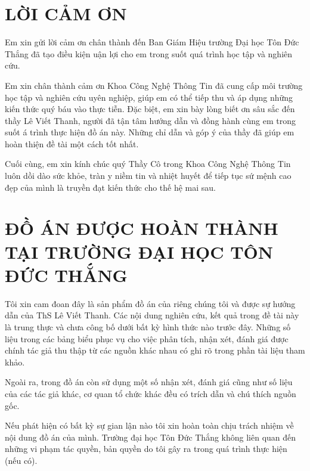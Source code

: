 \documentclass[13pt]{article}
\begin{document}
\chead{}
\cfoot{}
\rfoot{\thepage}

\newpage
\section*{LỜI CẢM ƠN}
    Em xin gửi lời cảm ơn chân thành đến Ban Giám Hiệu trường Đại học Tôn Đức Thắng đã tạo điều kiện uận lợi cho em trong suốt quá trình học tập và nghiên cứu.
    
    Em xin chân thành cảm ơn Khoa Công Nghệ Thông Tin đã cung cấp môi trường học tập và nghiên cứu uyên nghiệp, giúp em có thể tiếp thu và áp dụng những kiến thức quý báu vào thực tiễn. Đặc biệt, em xin bày lòng biết ơn sâu sắc đến thầy Lê Viết Thanh, người đã tận tâm hướng dẫn và đồng hành cùng em trong suốt á trình thực hiện đồ án này. Những chỉ dẫn và góp ý của thầy đã giúp em hoàn thiện đề tài một cách tốt nhất.
    
    Cuối cùng, em xin kính chúc quý Thầy Cô trong Khoa Công Nghệ Thông Tin luôn dồi dào sức khỏe, tràn y niềm tin và nhiệt huyết để tiếp tục sứ mệnh cao đẹp của mình là truyền đạt kiến thức cho thế hệ mai sau.
\newpage

\section*{ĐỒ ÁN ĐƯỢC HOÀN THÀNH TẠI TRƯỜNG ĐẠI HỌC TÔN ĐỨC THẮNG}
    Tôi xin cam đoan đây là sản phẩm đồ án của riêng chúng tôi và được sự hướng dẫn của ThS Lê Viết Thanh. Các nội dung nghiên cứu, kết quả trong đề tài này là trung thực và chưa công bố dưới bất kỳ hình thức nào trước đây. Những số liệu trong các bảng biểu phục vụ cho việc phân tích, nhận xét, đánh giá được chính tác giả thu thập từ các nguồn khác nhau có ghi rõ trong phần tài liệu tham khảo.
    
    Ngoài ra, trong đồ án còn sử dụng một số nhận xét, đánh giá cũng như số liệu của các tác giả khác, cơ quan tổ chức khác đều có trích dẫn và chú thích nguồn gốc.
    
    Nếu phát hiện có bất kỳ sự gian lận nào tôi xin hoàn toàn chịu trách nhiệm về nội dung đồ án của mình. Trường đại học Tôn Đức Thắng không liên quan đến những vi phạm tác quyền, bản quyền do tôi gây ra trong quá trình thực hiện (nếu có).
\end{document}
